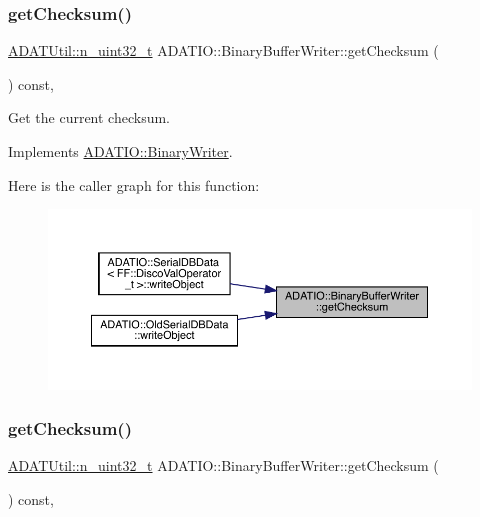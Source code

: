 \subsubsection{\texorpdfstring{getChecksum()}{getChecksum()}\hspace{0.1cm}{\footnotesize\ttfamily [1/2]}}
{\footnotesize\ttfamily \mbox{\hyperlink{namespaceADATUtil_ad945a8afa4db2d1f89b731964adae97e}{A\+D\+A\+T\+Util\+::n\+\_\+uint32\+\_\+t}} A\+D\+A\+T\+I\+O\+::\+Binary\+Buffer\+Writer\+::get\+Checksum (\begin{DoxyParamCaption}{ }\end{DoxyParamCaption}) const\hspace{0.3cm}{\ttfamily [inline]}, {\ttfamily [virtual]}}



Get the current checksum. 



Implements \mbox{\hyperlink{classADATIO_1_1BinaryWriter_a8bebb70a7248b14c8a4dcf7aa49c1503}{A\+D\+A\+T\+I\+O\+::\+Binary\+Writer}}.

Here is the caller graph for this function\+:\nopagebreak
\begin{figure}[H]
\begin{center}
\leavevmode
\includegraphics[width=350pt]{d8/d90/classADATIO_1_1BinaryBufferWriter_a3d7ec1583f03981f0a84571646be46f3_icgraph}
\end{center}
\end{figure}
\mbox{\label{classADATIO_1_1BinaryBufferWriter_a3d7ec1583f03981f0a84571646be46f3}} 
\subsubsection{\texorpdfstring{getChecksum()}{getChecksum()}\hspace{0.1cm}{\footnotesize\ttfamily [2/2]}}
{\footnotesize\ttfamily \mbox{\hyperlink{namespaceADATUtil_ad945a8afa4db2d1f89b731964adae97e}{A\+D\+A\+T\+Util\+::n\+\_\+uint32\+\_\+t}} A\+D\+A\+T\+I\+O\+::\+Binary\+Buffer\+Writer\+::get\+Checksum (\begin{DoxyParamCaption}{ }\end{DoxyParamCaption}) const\hspace{0.3cm}{\ttfamily [inline]}, {\ttfamily [virtual]}}



